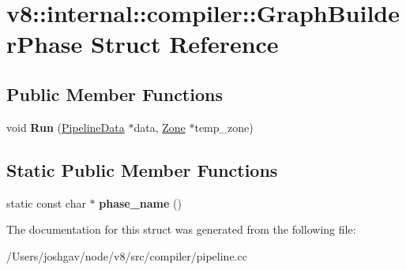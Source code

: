 \hypertarget{structv8_1_1internal_1_1compiler_1_1_graph_builder_phase}{}\section{v8\+:\+:internal\+:\+:compiler\+:\+:Graph\+Builder\+Phase Struct Reference}
\label{structv8_1_1internal_1_1compiler_1_1_graph_builder_phase}
\subsection*{Public Member Functions}
\begin{DoxyCompactItemize}
\item 
void {\bfseries Run} (\hyperlink{classv8_1_1internal_1_1compiler_1_1_pipeline_data}{Pipeline\+Data} $\ast$data, \hyperlink{classv8_1_1internal_1_1_zone}{Zone} $\ast$temp\+\_\+zone)\hypertarget{structv8_1_1internal_1_1compiler_1_1_graph_builder_phase_a38e1eecf4d86d54a109c5743f0f7dc38}{}\label{structv8_1_1internal_1_1compiler_1_1_graph_builder_phase_a38e1eecf4d86d54a109c5743f0f7dc38}

\end{DoxyCompactItemize}
\subsection*{Static Public Member Functions}
\begin{DoxyCompactItemize}
\item 
static const char $\ast$ {\bfseries phase\+\_\+name} ()\hypertarget{structv8_1_1internal_1_1compiler_1_1_graph_builder_phase_a6bb54c1550b475f16d9dceeab96f6bee}{}\label{structv8_1_1internal_1_1compiler_1_1_graph_builder_phase_a6bb54c1550b475f16d9dceeab96f6bee}

\end{DoxyCompactItemize}


The documentation for this struct was generated from the following file\+:\begin{DoxyCompactItemize}
\item 
/\+Users/joshgav/node/v8/src/compiler/pipeline.\+cc\end{DoxyCompactItemize}
